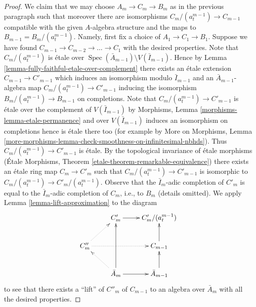 \documentclass{stacks-project}
\theoremstyle{plain}
\theoremstyle{definition}
\theoremstyle{remark}
\numberwithin{equation}{subsection}
\def\Spec{\mathop{\mathrm{Spec}}}
\begin{document}
\begin{proof}
\medskip\noindent
We claim that we may choose $A_m \to C_m \to B_m$ as in the previous
paragraph such that moreover there are isomorphisms
$C_m/(a_t^{m - 1}) \to C_{m - 1}$ compatible with the given
$A$-algebra structure and the maps to $B_{m - 1} = B_m/(a_t^{m - 1})$.
Namely, first fix a choice of $A_1 \to C_1 \to B_1$.
Suppose we have found $C_{m - 1} \to C_{m - 2} \to \ldots \to C_1$
with the desired properties.
Note that $C_m/(a_t^{m - 1})$ is \'etale over
$\Spec(\bar A_{m - 1}) \setminus V(\bar I_{m - 1})$.
Hence by Lemma \ref{lemma-fully-faithful-etale-over-complement}
there exists an \'etale extension $C_{m - 1} \to C'_{m - 1}$
which induces an isomorphism modulo $\bar I_{m - 1}$ and an
$\bar A_{m - 1}$-algebra map $C_m/(a_t^{m - 1}) \to C'_{m - 1}$
inducing the isomorphism $B_m/(a_t^{m - 1}) \to B_{m - 1}$ on completions.
Note that $C_m/(a_t^{m - 1}) \to C'_{m - 1}$ is \'etale over the complement
of $V(\bar I_{m - 1})$ by
Morphisms, Lemma \ref{morphisms-lemma-etale-permanence}
and over $V(\bar I_{m - 1})$ induces an isomorphism on completions
hence is \'etale there too (for example by More on Morphisms, Lemma
\ref{more-morphisms-lemma-check-smoothness-on-infinitesimal-nbhds}).
Thus $C_m/(a_t^{m - 1}) \to C'_{m - 1}$ is \'etale. By the
topological invariance of \'etale morphisms
(\'Etale Morphisms, Theorem \ref{etale-theorem-remarkable-equivalence})
there exists an \'etale ring map $C_m \to C'_m$ such that
$C_m/(a_t^{m - 1}) \to C'_{m - 1}$ is isomorphic to
$C_m/(a_t^{m - 1}) \to C'_m/(a_t^{m - 1})$. Observe that the
$\bar I_m$-adic completion of $C'_m$ is equal to the $\bar I_m$-adic
completion of $C_m$, i.e., to $B_m$ (details omitted).
We apply Lemma \ref{lemma-lift-approximation} to the diagram
$$
\xymatrix{
 & C'_m \ar[r] & C'_m/(a_t^{m - 1}) \\
C''_m \ar@{..>}[ru] \ar@{..>}[rr] & & C_{m - 1} \ar[u] \\
 & \bar A_m \ar[r] \ar[uu] \ar@{..>}[lu] & \bar A_{m - 1} \ar[u]
}
$$
to see that there exists a ``lift'' of $C''_m$ of $C_{m - 1}$
to an algebra over $\bar A_m$ with all the desired properties.


\end{proof}
\end{document}
